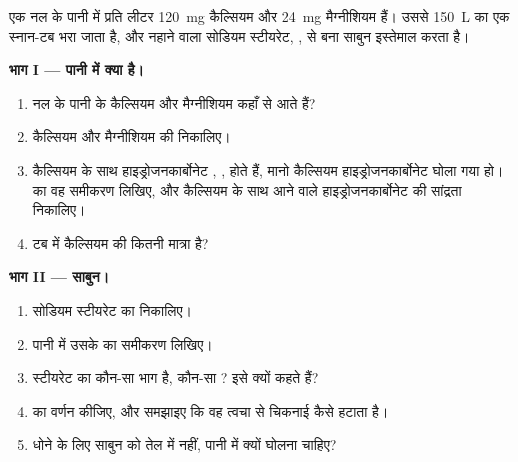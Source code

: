 \begin{problem}
\label{pb:g11:dissolution:1}
एक नल के पानी में प्रति लीटर \qty{120}{mg} कैल्सियम  और \qty{24}{mg}
मैग्नीशियम  हैं। उससे \qty{150}{L} का एक स्नान-टब भरा जाता है, और
नहाने वाला सोडियम स्टीयरेट, , से बना साबुन इस्तेमाल करता है।

\medskip
\noindent\textbf{भाग I --- पानी में क्या है।}
\begin{enumerate}
  \item नल के पानी के कैल्सियम और मैग्नीशियम  कहाँ से आते हैं?
  \item कैल्सियम  और मैग्नीशियम  की  निकालिए।
  \item कैल्सियम  के साथ हाइड्रोजनकार्बोनेट ,
        , होते हैं, मानो कैल्सियम हाइड्रोजनकार्बोनेट 
        घोला गया हो।  का वह समीकरण लिखिए, और कैल्सियम के साथ आने वाले
        हाइड्रोजनकार्बोनेट  की सांद्रता
        निकालिए।
  \item टब में कैल्सियम  की कितनी मात्रा है?
\end{enumerate}

\medskip
\noindent\textbf{भाग II --- साबुन।}
\begin{enumerate}[resume]
  \item सोडियम स्टीयरेट का  निकालिए।
  \item पानी में उसके  का समीकरण लिखिए।
  \item स्टीयरेट  का कौन-सा भाग  है, कौन-सा
        ? इसे  क्यों कहते हैं?
  \item {} का वर्णन कीजिए, और समझाइए कि वह त्वचा से चिकनाई कैसे
        हटाता है।
  \item धोने के लिए साबुन को तेल में नहीं, पानी में क्यों घोलना चाहिए?
\end{enumerate}


\end{problem}
